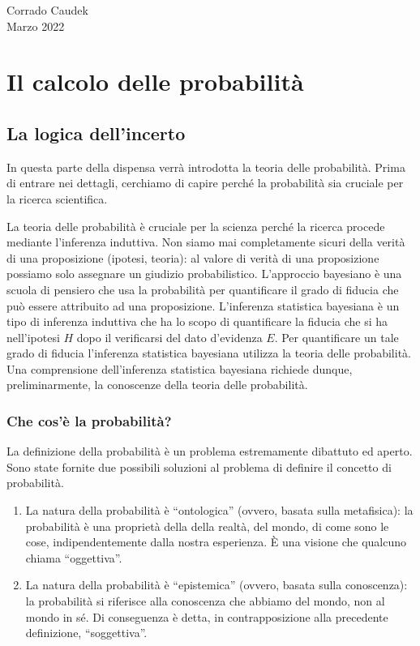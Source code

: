 \documentclass[
  11pt,
]{krantz}
\theoremstyle{definition}
\theoremstyle{definition}
\theoremstyle{definition}
\theoremstyle{definition}
\theoremstyle{remark}
\begin{document}
\begin{flushright}
Corrado Caudek\\
Marzo 2022 \end{flushright}

\mainmatter

\hypertarget{part-il-calcolo-delle-probabilituxe0}{%
\part{Il calcolo delle probabilità}\label{part-il-calcolo-delle-probabilituxe0}}

\hypertarget{intro-prob-1}{%
\chapter{La logica dell'incerto}\label{intro-prob-1}}

In questa parte della dispensa verrà introdotta la teoria delle probabilità. Prima di entrare nei dettagli, cerchiamo di capire perché la probabilità sia cruciale per la ricerca scientifica.

La teoria delle probabilità è cruciale per la scienza perché la ricerca procede mediante l'inferenza induttiva. Non siamo mai completamente sicuri della verità di una proposizione (ipotesi, teoria): al valore di verità di una proposizione possiamo solo assegnare un giudizio probabilistico. L'approccio bayesiano è una scuola di pensiero che usa la probabilità per quantificare il grado di fiducia che può essere attribuito ad una proposizione. L'inferenza statistica bayesiana è un tipo di inferenza induttiva che ha lo scopo di quantificare la fiducia che si ha nell'ipotesi \(H\) dopo il verificarsi del dato d'evidenza \(E\). Per quantificare un tale grado di fiducia l'inferenza statistica bayesiana utilizza la teoria delle probabilità. Una comprensione dell'inferenza statistica bayesiana richiede dunque, preliminarmente, la conoscenze della teoria delle probabilità.

\hypertarget{che-cosuxe8-la-probabilituxe0}{%
\section{Che cos'è la probabilità?}\label{che-cosuxe8-la-probabilituxe0}}

La definizione della probabilità è un problema estremamente dibattuto ed aperto. Sono state fornite due possibili soluzioni al problema di definire il concetto di probabilità.

\begin{enumerate}
\def\labelenumi{(\alph{enumi})}
\item
  La natura della probabilità è ``ontologica'' (ovvero, basata sulla metafisica): la probabilità è una proprietà della della realtà, del mondo, di come sono le cose, indipendentemente dalla nostra esperienza. È una visione che qualcuno chiama ``oggettiva''.
\item
  La natura della probabilità è ``epistemica'' (ovvero, basata sulla conoscenza): la probabilità si riferisce alla conoscenza che abbiamo del mondo, non al mondo in sé. Di conseguenza è detta, in contrapposizione alla precedente definizione, ``soggettiva''.
\end{enumerate}
\end{document}
